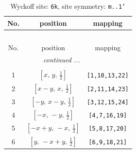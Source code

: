 \documentclass[fleqn,8pt]{jsarticle}
\begin{document}
\renewcommand{\arraystretch}{1.2}
\begin{longtable}{ccc}
\caption{Wyckoff site: {\tt 6k}, site symmetry: {\tt m..1'}}
 \\
 \hline \hline
No. & position & mapping \\ \hline \endfirsthead

\multicolumn{2}{l}{\tablename\ \thetable{}} \\
 \hline \hline
No. & position & mapping \\ \hline \endhead

 \hline \hline
\multicolumn{2}{r}{\footnotesize\it continued ...} \\ \endfoot

 \hline \hline
\multicolumn{2}{r}{} \\ \endlastfoot

1 & $\left[ x,\, y,\, \frac{1}{2} \right]$ & {\tt [1,10,13,22]} \\ \hline
2 & $\left[ x - y,\, x,\, \frac{1}{2} \right]$ & {\tt [2,11,14,23]} \\ \hline
3 & $\left[ - y,\, x - y,\, \frac{1}{2} \right]$ & {\tt [3,12,15,24]} \\ \hline
4 & $\left[ - x,\, - y,\, \frac{1}{2} \right]$ & {\tt [4,7,16,19]} \\ \hline
5 & $\left[ - x + y,\, - x,\, \frac{1}{2} \right]$ & {\tt [5,8,17,20]} \\ \hline
6 & $\left[ y,\, - x + y,\, \frac{1}{2} \right]$ & {\tt [6,9,18,21]} \\
\end{longtable}
\renewcommand{\arraystretch}{1.2}
\end{document}
